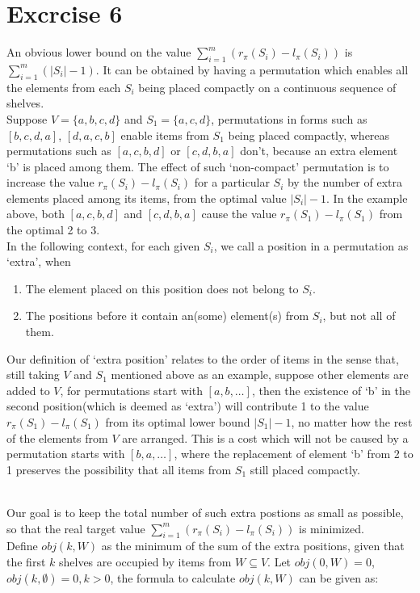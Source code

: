 \documentclass[10pt]{article}
\begin{document}
\section*{Excrcise 6}
{\color{red}
An obvious lower bound on the value  $\sum_{i=1}^{m}(r_{\pi}(S_i) - l_{\pi}(S_i))$ is $\sum_{i=1}^{m}(|S_i| - 1)$. It can be obtained by having a permutation which enables all the elements from each $S_i$ being placed compactly on a continuous sequence of shelves. \\
Suppose $V = \{a, b, c, d\}$ and $S_1 = \{a, c, d\}$, permutations in forms such as $[b, c, d, a]$, $[d, a, c, b]$ enable items from $S_1$ being placed compactly, whereas permutations such as $[a, c, b, d]$ or $[c, d, b, a]$ don't, because an extra element `b' is placed among them. The effect of such `non-compact' permutation is to increase the value $r_{\pi}(S_i) - l_{\pi}(S_i)$ for a particular $S_i$ by the number of extra elements placed among its items, from the optimal value $|S_i| - 1$. In the example above, both $[a, c, b, d]$ and $[c, d, b, a]$ cause the value $r_{\pi}(S_1) - l_{\pi}(S_1)$ from the optimal 2 to 3.\\
In the following context, for each given $S_i$, we call a position in a permutation as `extra', when
\begin{enumerate}
\item The element placed on this position does not belong to $S_i$.
\item The positions before it contain an(some) element(s) from $S_i$, but not all of them.
\end{enumerate}
Our definition of `extra position' relates to the order of items in the sense that, still taking $V$ and $S_1$ mentioned above as an example, suppose other elements are added to $V$, for permutations start with $[a, b, \dots]$, then the existence of `b' in the second position(which is deemed as `extra') will contribute 1 to the value $r_{\pi}(S_1) - l_{\pi}(S_1)$ from its optimal lower bound $|S_1| - 1$, no matter how the rest of the elements from $V$ are arranged. This is a cost which will not be caused by a permutation starts with $[b, a, \dots]$, where the replacement of element `b' from 2 to 1 preserves the possibility that all items from $S_1$ still placed compactly.}\\
Our goal is to keep the total number of such extra postions as small as possible, so that the real target value $\sum_{i=1}^{m}(r_{\pi}(S_i) - l_{\pi}(S_i))$ is minimized.\\
Define $obj(k, W)$ as the minimum of the sum of the extra positions, given that the first $k$ shelves are occupied by items from $W \subseteq V$. Let $obj(0, W) = 0$, $obj(k, \emptyset) = 0, k > 0$, the formula to calculate $obj(k,W)$ can be given as:
\end{document}

